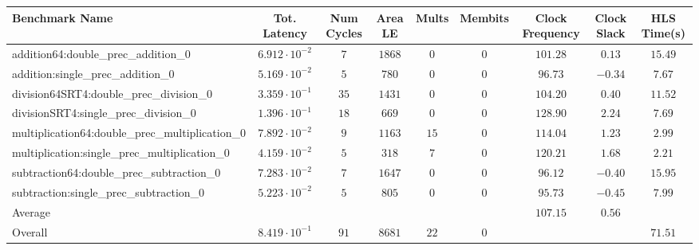 \begin{tabular}{|l|c|c|c|c|c|c|c|c|}
\hline
Benchmark Name                                   & Tot. Latency            & Num Cycles & Area LE  & Mults  & Membits & Clock Frequency & Clock Slack & HLS Time(s) \\
\hline
addition64:double\_prec\_addition\_0             & $ 6.912 \cdot 10^{-2} $ & $ 7      $ & $ 1868 $ & $ 0  $ & $ 0   $ & $ 101.28      $ & $ 0.13    $ & $ 15.49   $ \\
addition:single\_prec\_addition\_0               & $ 5.169 \cdot 10^{-2} $ & $ 5      $ & $ 780  $ & $ 0  $ & $ 0   $ & $ 96.73       $ & $ -0.34   $ & $ 7.67    $ \\
division64SRT4:double\_prec\_division\_0         & $ 3.359 \cdot 10^{-1} $ & $ 35     $ & $ 1431 $ & $ 0  $ & $ 0   $ & $ 104.20      $ & $ 0.40    $ & $ 11.52   $ \\
divisionSRT4:single\_prec\_division\_0           & $ 1.396 \cdot 10^{-1} $ & $ 18     $ & $ 669  $ & $ 0  $ & $ 0   $ & $ 128.90      $ & $ 2.24    $ & $ 7.69    $ \\
multiplication64:double\_prec\_multiplication\_0 & $ 7.892 \cdot 10^{-2} $ & $ 9      $ & $ 1163 $ & $ 15 $ & $ 0   $ & $ 114.04      $ & $ 1.23    $ & $ 2.99    $ \\
multiplication:single\_prec\_multiplication\_0   & $ 4.159 \cdot 10^{-2} $ & $ 5      $ & $ 318  $ & $ 7  $ & $ 0   $ & $ 120.21      $ & $ 1.68    $ & $ 2.21    $ \\
subtraction64:double\_prec\_subtraction\_0       & $ 7.283 \cdot 10^{-2} $ & $ 7      $ & $ 1647 $ & $ 0  $ & $ 0   $ & $ 96.12       $ & $ -0.40   $ & $ 15.95   $ \\
subtraction:single\_prec\_subtraction\_0         & $ 5.223 \cdot 10^{-2} $ & $ 5      $ & $ 805  $ & $ 0  $ & $ 0   $ & $ 95.73       $ & $ -0.45   $ & $ 7.99    $ \\
\hline
Average                                          & $                     $ & $        $ & $      $ & $    $ & $     $ & $ 107.15      $ & $ 0.56    $ & $         $ \\
\hline
Overall                                          & $ 8.419 \cdot 10^{-1} $ & $ 91     $ & $ 8681 $ & $ 22 $ & $ 0   $ & $             $ & $         $ & $ 71.51   $ \\
\hline
\end{tabular}
